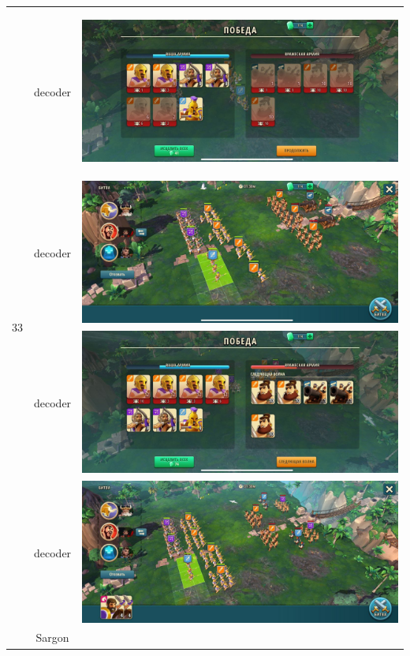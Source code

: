\begin{longtable}{|c|c|c|}
    \hline
    \multirow{8}{*}{33} & decoder &
    \hypertarget{fight33}{\includegraphics[width=0.75\linewidth]{./parts/media/TreasureHunt/33/decoder/photo_2022-04-07_10-02-27.jpg}} \\
    & decoder &
    \includegraphics[width=0.75\linewidth]{./parts/media/TreasureHunt/33/decoder/photo_2022-04-07_10-02-23.jpg} \\
    & decoder &
    \includegraphics[width=0.75\linewidth]{./parts/media/TreasureHunt/33/decoder/photo_2022-04-07_10-02-19.jpg} \\
    & decoder &
    \includegraphics[width=0.75\linewidth]{./parts/media/TreasureHunt/33/decoder/photo_2022-04-07_10-02-11.jpg} \\
    \hline
    \multirow{8}{*}{33} & Sargon &

\end{longtable}
